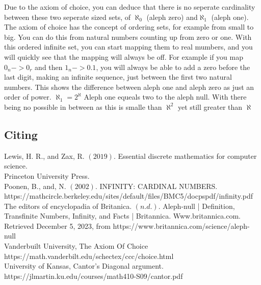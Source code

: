 \documentclass{article}
\begin{document}
\begin{large}
      Due to the axiom of choice, you can deduce that there is no seperate cardinality between these two seperate sized sets, of $ \aleph_0 $  (aleph zero) and$ \aleph_1 $ (aleph one).
The axiom of choice has the concept of ordering sets, for example from small to big.
You can do this from natural numbers counting up from zero or one.
With this ordered infinite set, you can start mapping them to real mumbers, and you will quickly see that the mapping will always be off.
For example if you map $0_n -> 0_r$ and then $ 1_n -> 0.1$, you will always be able to add a zero before the last digit, making an infinite sequence, just between the first two natural numbers.
This shows the difference between aleph one and aleph zero as just an order of power.
$ \aleph_1 = 2^\aleph$ Aleph one equeals two to the aleph null.
With there being no possible in between as this is smalle than $\aleph^2$ yet still greater than $\aleph$

      

\end{large}
\newpage
\begin{Huge}
{\center \section{Citing}}
\end{Huge}
\begin{large}
  Lewis, H. R., and Zax, R. $ (2019) $. Essential discrete mathematics for computer science.
  \\
        Princeton University Press.
\\
Poonen, B., and, N. $ (2002) $. INFINITY: CARDINAL NUMBERS.
     https://mathcircle.berkeley.edu/sites/default/files/BMC5/docpspdf/infinity.pdf
\\
The editors of encyclopadia of Britanica. $ (n.d.) $. Aleph-null | Definition, Transfinite
       Numbers, Infinity, and Facts | Britannica. Www.britannica.com. Retrieved
       December 5, 2023, from https://www.britannica.com/science/aleph-null
       \\
       Vanderbuilt University, The Axiom Of Choice
       https://math.vanderbilt.edu/schectex/ccc/choice.html
       \\
University of Kansas, Cantor's Diagonal argument.
     https://jlmartin.ku.edu/courses/math410-S09/cantor.pdf
     \\


     
     

\end{large}
\end{document}
